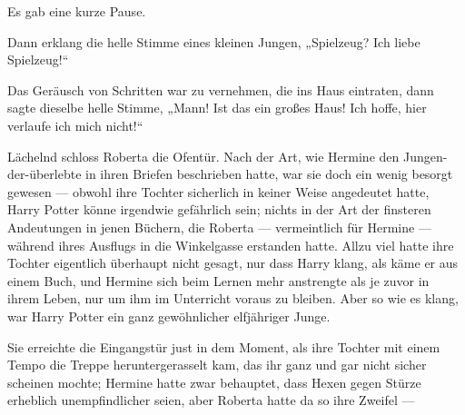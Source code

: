 Es gab eine kurze Pause.

Dann erklang die helle Stimme eines kleinen Jungen,
„Spielzeug? Ich liebe Spielzeug!“

Das Geräusch von Schritten war zu vernehmen, die ins Haus eintraten, dann sagte dieselbe helle Stimme,
„Mann! Ist das ein großes Haus! Ich hoffe, hier verlaufe ich mich nicht!“

Lächelnd schloss Roberta die Ofentür. Nach der Art, wie Hermine den Jungen-der-überlebte in ihren Briefen beschrieben hatte, war sie doch ein wenig besorgt gewesen — obwohl ihre Tochter sicherlich in keiner Weise angedeutet hatte, Harry Potter könne irgendwie gefährlich sein; nichts in der Art der finsteren Andeutungen in jenen Büchern, die Roberta — vermeintlich für Hermine — während ihres Ausflugs in die Winkelgasse erstanden hatte. Allzu viel hatte ihre Tochter eigentlich überhaupt nicht gesagt, nur dass Harry klang, als käme er aus einem Buch, und Hermine sich beim Lernen mehr anstrengte als je zuvor in ihrem Leben, nur um ihm im Unterricht voraus zu bleiben. Aber so wie es klang, war Harry Potter ein ganz gewöhnlicher elfjähriger Junge.

Sie erreichte die Eingangstür just in dem Moment, als ihre Tochter mit einem Tempo die Treppe heruntergerasselt kam, das ihr ganz und gar nicht sicher scheinen mochte; Hermine hatte zwar behauptet, dass Hexen gegen Stürze erheblich unempfindlicher seien, aber Roberta hatte da so ihre Zweifel —


